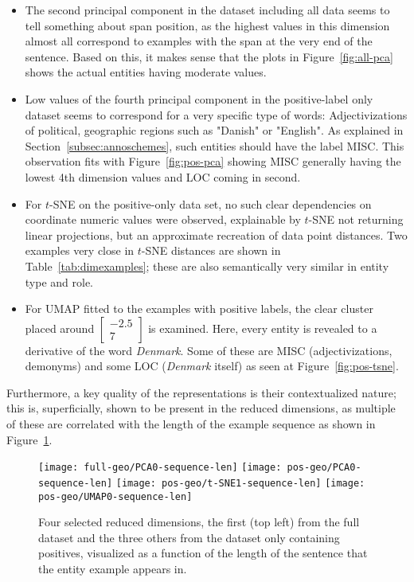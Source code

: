 \documentclass[main.tex]{subfiles}
\begin{document}
\begin{itemize}
    \item
        The second principal component in the dataset including all data seems to tell something about span position, as the highest values in this dimension almost all correspond to examples with the span at the very end of the sentence.
        Based on this, it makes sense that the plots in Figure~\ref{fig:all-pca} shows the actual entities having moderate values.
    \item
        Low values of the fourth principal component in the positive-label only dataset seems to correspond for a very specific type of words:
        Adjectivizations of political, geographic regions such as "Danish" or "English".
        As explained in Section~\ref{subsec:annoschemes}, such entities should have the label MISC.
        This observation fits with Figure~\ref{fig:pos-pca} showing MISC generally having the lowest 4th dimension values and LOC coming in second.
    \item
        For $t$-SNE on the positive-only data set, no such clear dependencies on coordinate numeric values were observed, explainable by $t$-SNE not returning linear projections, but an approximate recreation of data point distances.
        Two examples very close in $t$-SNE distances are shown in Table~\ref{tab:dimexamples}; these are also semantically very similar in entity type and role.
    \item
        For UMAP fitted to the examples with positive labels, the clear cluster placed around $\begin{bmatrix} -2.5\\ 7\end{bmatrix}$ is examined.
        Here, every entity is revealed to a derivative of the word \emph{Denmark}.
        Some of these are MISC (adjectivizations, demonyms) and some LOC (\emph{Denmark} itself) as seen at Figure~\ref{fig:pos-tsne}.
\end{itemize}
Furthermore, a key quality of the representations is their contextualized nature; this is, superficially, shown to be present in the reduced dimensions, as multiple of these are correlated with the length of the example sequence as shown in Figure~\ref{fig:repvslen}.

\begin{figure}[H]
    \centering
        \texttt{[image: full-geo/PCA0-sequence-len]}
        \texttt{[image: pos-geo/PCA0-sequence-len]}
        \texttt{[image: pos-geo/t-SNE1-sequence-len]}
        \texttt{[image: pos-geo/UMAP0-sequence-len]}
     \caption{
        Four selected reduced dimensions, the first (top left) from the full dataset and the three others from the dataset only containing positives, visualized as a function of the length of the sentence that the entity example appears in.
    }
    \label{fig:repvslen}
\end{figure}\noindent
\end{document}
